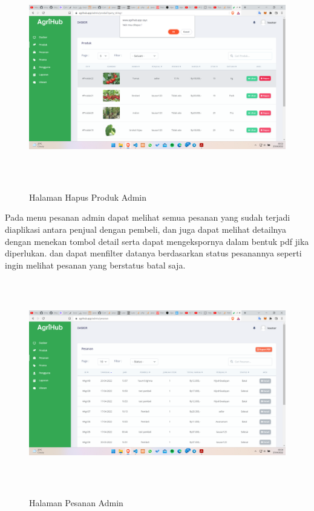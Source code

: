\begin{enumerate}
\begin{enumerate}
			\begin{figure}[H]
				\centering
				{\includegraphics [width = 14.3cm, height= 9cm]{gambar/admin/hapus_produk_admin}}
				\caption{Halaman Hapus Produk Admin}
				\label{hapus_produk_admin}
			\end{figure}

			\par Pada menu pesanan admin dapat melihat semua pesanan yang sudah terjadi diaplikasi antara penjual dengan pembeli, dan juga dapat melihat detailnya dengan menekan tombol detail serta dapat mengekspornya dalam bentuk pdf jika diperlukan. dan dapat menfilter datanya berdasarkan status pesanannya seperti ingin melihat pesanan yang berstatus batal saja.

			\begin{figure}[H]
				\centering
				{\includegraphics [width = 14.3cm, height= 9cm]{gambar/admin/pesanan_admin}}
				\caption{Halaman Pesanan Admin}
				\label{pesanan_admin}
			\end{figure}


\end{enumerate}
\end{enumerate}
